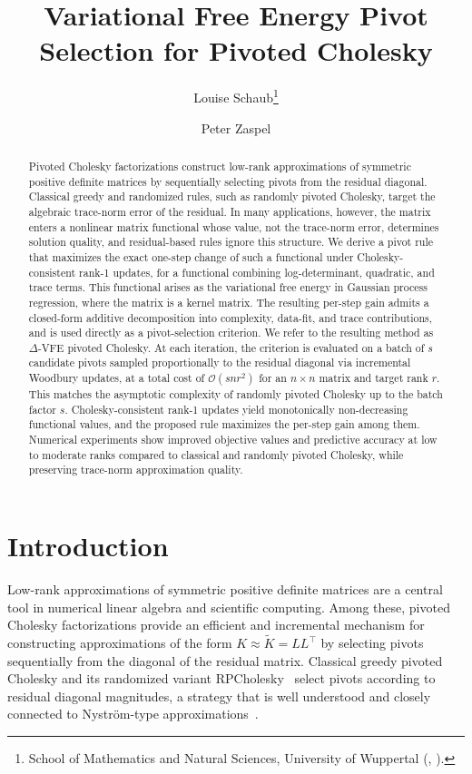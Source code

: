 \documentclass[onefignum,onetabnum]{siamart250211}
\title{Variational Free Energy Pivot Selection for Pivoted Cholesky}%
\author{Louise Schaub\thanks{School of Mathematics and Natural Sciences, University of Wuppertal (\email{schaub@uni-wuppertal.de}, \email{zaspel@uni-wuppertal.de}).}
\and Peter Zaspel\footnotemark[1]}
\begin{document}
\maketitle

\begin{abstract}
Pivoted Cholesky factorizations construct low-rank approximations of symmetric positive definite matrices by sequentially selecting pivots from the residual diagonal. Classical greedy and randomized rules, such as randomly pivoted Cholesky, target the algebraic trace-norm error of the residual. In many applications, however, the matrix enters a nonlinear matrix functional whose value, not the trace-norm error, determines solution quality, and residual-based rules ignore this structure. 
We derive a pivot rule that maximizes the exact one-step change of such a functional under Cholesky-consistent rank-1 updates, for a functional combining log-determinant, quadratic, and trace terms. 
This functional arises as the variational free energy in Gaussian process regression, where the matrix is a kernel matrix. The resulting per-step gain admits a closed-form additive decomposition into complexity, data-fit, and trace contributions, and is used directly as a pivot-selection criterion. We refer to the resulting method as $\Delta$-VFE pivoted Cholesky. At each iteration, the criterion is evaluated on a batch of $s$ candidate pivots sampled proportionally to the residual diagonal via incremental Woodbury updates, at a total cost of $\mathcal{O}(snr^2)$ for an $n\times n$ matrix and target rank $r$. This matches the asymptotic complexity of randomly pivoted Cholesky up to the batch factor $s$. Cholesky-consistent rank-1 updates yield monotonically non-decreasing functional values, and the proposed rule maximizes the per-step gain among them. Numerical experiments show improved objective values and predictive accuracy at low to moderate ranks compared to classical and randomly pivoted Cholesky, while preserving trace-norm approximation quality.
\end{abstract}
\section{Introduction}
Low-rank approximations of symmetric positive definite matrices are a central tool in numerical linear algebra and scientific computing. Among these, pivoted Cholesky factorizations \cite{harbrecht.2012, higham.1990, higham.2009} provide an efficient and incremental mechanism for constructing approximations of the form $K \approx \widetilde{K}= LL^\top$ by selecting pivots sequentially from the diagonal of the residual matrix. Classical greedy pivoted Cholesky and its randomized variant RPCholesky~\cite{chen.2025} select pivots according to residual diagonal magnitudes, a strategy that is well understood and closely connected to Nystr\"om-type approximations~\cite{halko.2011}. 
\end{document}
